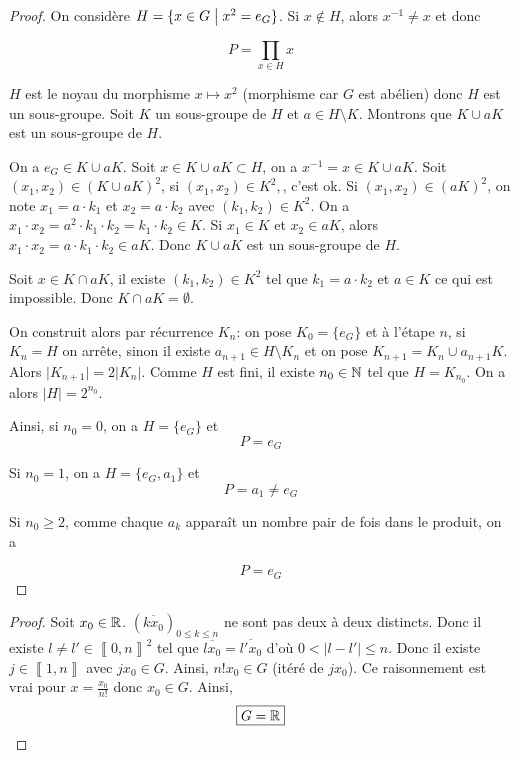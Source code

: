 \begin{proof}
	On considère $H=\{x\in G\bigm| x^{2}=e_{G}\}$. Si $x\notin H$, alors $x^{-1}\neq x$ et donc 
	
	\begin{equation}
		P=\prod_{x\in H}x	
	\end{equation}
	
	$H$ est le noyau du morphisme $x\mapsto x^{2}$ (morphisme car $G$ est abélien) donc $H$ est un sous-groupe. Soit $K$ un sous-groupe de $H$ et $a\in H\setminus K$. Montrons que $K\cup aK$ est un sous-groupe de $H$.
	
	On a $e_{G}\in K\cup aK$. Soit $x\in K\cup aK\subset H$, on a $x^{-1}=x\in K\cup aK$. Soit $(x_{1},x_{2})\in (K\cup aK)^{2}$, si $(x_{1},x_{2})\in K^{2},$, c'est ok. Si $(x_{1},x_{2})\in (aK)^{2}$, on note $x_{1}=a\cdot k_{1}$ et $x_{2}=a\cdot k_{2}$ avec $(k_{1},k_{2})\in K^{2}$. On a $x_{1}\cdot x_{2}=a^{2}\cdot k_{1}\cdot k_{2}=k_{1}\cdot k_{2}\in K$. Si $x_{1}\in K$ et $x_{2}\in aK$, alors $x_{1}\cdot x_{2}=a\cdot k_{1}\cdot k_{2}\in aK$. Donc $K\cup aK$ est un sous-groupe de $H$.

	Soit $x\in K\cap aK$, il existe $(k_{1},k_{2})\in K^{2}$ tel que $k_{1}=a\cdot k_{2}$ et $a\in K$ ce qui est impossible. Donc $K\cap aK=\emptyset$.

	On construit alors par récurrence $K_{n}$: on pose $K_{0}=\{e_{G}\}$ et à l'étape $n$, si $K_{n}=H$ on arrête, sinon il existe $a_{n+1}\in H\setminus K_{n}$ et on pose $K_{n+1}=K_{n}\cup a_{n+1}K$. Alors $\vert K_{n+1}\vert=2\vert K_{n}\vert$. Comme $H$ est fini, il existe $n_{0}\in\mathbb{N}$ tel que $H=K_{n_{0}}$. On a alors $\vert H\vert=2^{n_{0}}$.

	Ainsi, si $n_{0}=0$, on a $H=\{e_{G}\}$ et 
	\begin{equation}
		\boxed{P=e_{G}}
	\end{equation}
	
	Si $n_{0}=1$, on a $H=\{e_{G},a_{1}\}$ et 
	\begin{equation}
		\boxed{P=a_{1}\neq e_{G}}
	\end{equation}
	
	Si $n_{0}\geqslant 2$, comme chaque $a_{k}$ apparaît un nombre pair de fois dans le produit, on a 
	
	\begin{equation}
		\boxed{P=e_{G}}
	\end{equation}
\end{proof}

\begin{proof}
	Soit $x_{0}\in\mathbb{R}$. $(\overline{kx_{0}})_{0\leqslant k\leqslant n}$ ne sont pas deux à deux distincts. Donc il existe $l\neq l'\in\left\llbracket 0,n\right\rrbracket^{2}$ tel que $\overline{lx_{0}}=\overline{l'x_{0}}$ d'où $0<\vert l-l'\vert\leqslant n$. Donc il existe $j\in\left\llbracket 1, n\right\rrbracket$ avec $jx_{0}\in G$. Ainsi, $n!x_{0}\in G$ (itéré de $jx_{0}$). Ce raisonnement est vrai pour $x=\frac{x_{0}}{n!}$ donc $x_{0}\in G$. Ainsi, 
	\begin{equation}
		\boxed{G=\mathbb{R}}
	\end{equation}
\end{proof}

